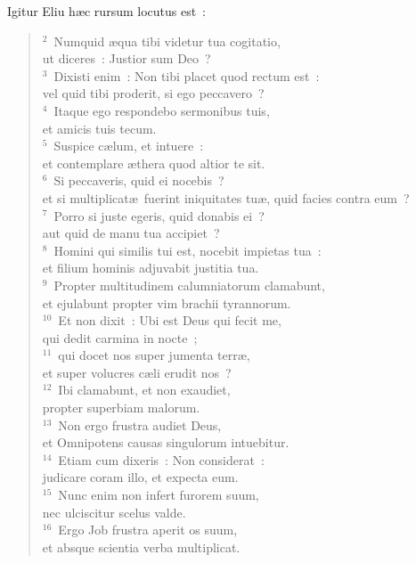 \lettrine[lines=3,image=true,loversize=0.05,lraise=-0.03]{I}{}gitur Eliu h\ae c rursum locutus est~:
\begin{flushleft}\begin{verse}\vspace{6pt}${}^{2}$~Numquid \ae qua tibi videtur tua cogitatio,\\ ut diceres~: Justior sum Deo~?\\
${}^{3}$~Dixisti enim~: Non tibi placet quod rectum est~:\\ vel quid tibi proderit, si ego peccavero~?\\
${}^{4}$~Itaque ego respondebo sermonibus tuis,\\ et amicis tuis tecum.\\
${}^{5}$~Suspice c\ae lum, et intuere~:\\ et contemplare \ae thera quod altior te sit.\\
${}^{6}$~Si peccaveris, quid ei nocebis~?\\ et si multiplicat\ae\ fuerint iniquitates tu\ae , quid facies contra eum~?\\
${}^{7}$~Porro si juste egeris, quid donabis ei~?\\ aut quid de manu tua accipiet~?\\
${}^{8}$~Homini qui similis tui est, nocebit impietas tua~:\\ et filium hominis adjuvabit justitia tua.\\
${}^{9}$~Propter multitudinem calumniatorum clamabunt,\\ et ejulabunt propter vim brachii tyrannorum.\\
${}^{10}$~Et non dixit~: Ubi est Deus qui fecit me,\\ qui dedit carmina in nocte~;\\
${}^{11}$~qui docet nos super jumenta terr\ae ,\\ et super volucres c\ae li erudit nos~?\\
${}^{12}$~Ibi clamabunt, et non exaudiet,\\ propter superbiam malorum.\\
${}^{13}$~Non ergo frustra audiet Deus,\\ et Omnipotens causas singulorum intuebitur.\\
${}^{14}$~Etiam cum dixeris~: Non considerat~:\\ judicare coram illo, et expecta eum.\\
${}^{15}$~Nunc enim non infert furorem suum,\\ nec ulciscitur scelus valde.\\
${}^{16}$~Ergo Job frustra aperit os suum,\\ et absque scientia verba multiplicat.\end{verse}\end{flushleft}



